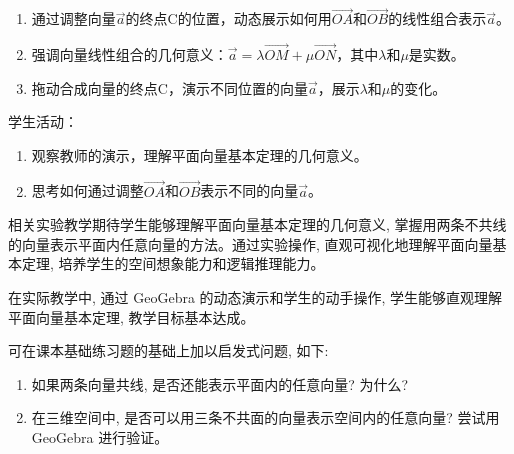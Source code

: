 \begin{description}
\begin{enumerate}[label=(\zhnum*)]
\begin{enumerate}
            \item 通过调整向量\(\overrightarrow{a}\)的终点\(\mathrm{C}\)的位置，动态展示如何用\(\overrightarrow{OA}\)和\(\overrightarrow{OB}\)的线性组合表示\(\overrightarrow{a}\)。
            \item 强调向量线性组合的几何意义：\(\overrightarrow{a}=\lambda\overrightarrow{OM}+\mu\overrightarrow{ON}\)，其中\(\lambda\)和\(\mu\)是实数。
            \item 拖动合成向量的终点\(\mathrm{C}\)，演示不同位置的向量\(\overrightarrow{a}\)，展示\(\lambda\)和\(\mu\)的变化。
        \end{enumerate}

        \hspace*{2em}学生活动：
        \begin{enumerate}
            \item 观察教师的演示，理解平面向量基本定理的几何意义。
            \item 思考如何通过调整\(\overrightarrow{OA}\)和\(\overrightarrow{OB}\)表示不同的向量\(\overrightarrow{a}\)。
        \end{enumerate}
    \end{enumerate}
  \item[结论] \hspace*{2em} 相关实验教学期待学生能够理解平面向量基本定理的几何意义, 掌握用两条不共线的向量表示平面内任意向量的方法。通过实验操作, 直观可视化地理解平面向量基本定理, 培养学生的空间想象能力和逻辑推理能力。

  在实际教学中, 通过 GeoGebra 的动态演示和学生的动手操作, 学生能够直观理解平面向量基本定理, 教学目标基本达成。
  \item[分析]
  \hspace*{2em} 可在课本基础练习题的基础上加以启发式问题, 如下:
  \begin{enumerate}
    \item 如果两条向量共线, 是否还能表示平面内的任意向量? 为什么?
    \item 在三维空间中, 是否可以用三条不共面的向量表示空间内的任意向量? 尝试用 GeoGebra 进行验证。
  \end{enumerate}
\end{description}



